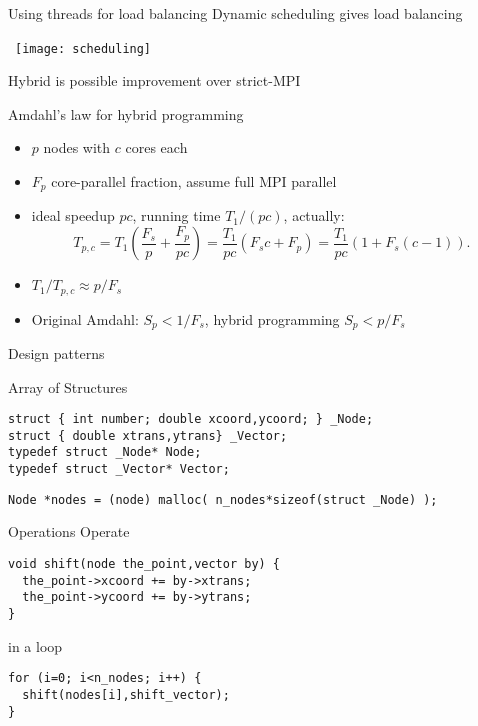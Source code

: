 \begin{numberedframe}{Using threads for load balancing}
  Dynamic scheduling gives load balancing

  \hbox{\kern -20pt \texttt{[image: scheduling]}}

  Hybrid is possible improvement over strict-MPI
\end{numberedframe}

\begin{numberedframe}{Amdahl's law for hybrid programming}
  \begin{itemize}
  \item $p$ nodes with $c$ cores each
  \item $F_p$ core-parallel fraction, assume full MPI parallel
  \item ideal speedup $p c$, running time $T_1/(pc)$, actually:
    \[
    T_{p,c} = T_1 \left(\frac {F_s}{p} + \frac{F_p}{p c}\right)
    = \frac{T_1}{pc}\left( F_sc+F_p\right) 
    = \frac{T_1}{pc}\left( 1+ F_s(c-1)\right).
    \]
    \item $T_1/T_{p,c} \approx p/F_s$
    \item Original Amdahl: $S_p<1/F_s$, hybrid programming $S_p<p/F_s$
  \end{itemize}
\end{numberedframe}

 {Design patterns}

\begin{numberedframe}{Array of Structures}
\begin{lstlisting}
struct { int number; double xcoord,ycoord; } _Node;
struct { double xtrans,ytrans} _Vector;
typedef struct _Node* Node;
typedef struct _Vector* Vector;
\end{lstlisting}
\begin{lstlisting}
Node *nodes = (node) malloc( n_nodes*sizeof(struct _Node) );
\end{lstlisting}
\end{numberedframe}

\begin{numberedframe}{Operations}
Operate
\begin{lstlisting}
void shift(node the_point,vector by) {
  the_point->xcoord += by->xtrans;
  the_point->ycoord += by->ytrans;
}
\end{lstlisting}
in a loop
\begin{lstlisting}
for (i=0; i<n_nodes; i++) {
  shift(nodes[i],shift_vector);
}
\end{lstlisting}
\end{numberedframe}

